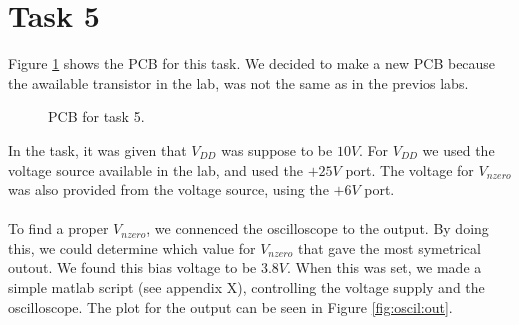 \documentclass[a4paper,english,11pt]{article}
\begin{document}
\section{Task 5}
Figure \ref{fig:pcb} shows the PCB for this task. We decided to make a new PCB because the awailable transistor in the lab, was not the same as in the previos labs.
\begin{figure}[!htbp]
 \centering
  \caption{PCB for task 5.}
  \label{fig:pcb}	
\end{figure}
In the task, it was given that $V_{DD}$ was suppose to be $10 V$. For $V_{DD}$ we used the voltage source available in the lab, and used the $+ 25V$ port.
The voltage for $V_{nzero}$ was also provided from the voltage source, using the $+ 6V$ port.\\
\\
To find a proper $V_{nzero}$, we connenced the oscilloscope to the output. By doing this, we could determine which value for $V_{nzero}$ that gave the 
most symetrical outout. We found this bias voltage to be $3.8V$. When this was set, we made a simple matlab script (see appendix X), controlling the 
voltage supply and the oscilloscope. The plot for the output can be seen in Figure \ref{fig:oscil:out}.\\
\end{document}
